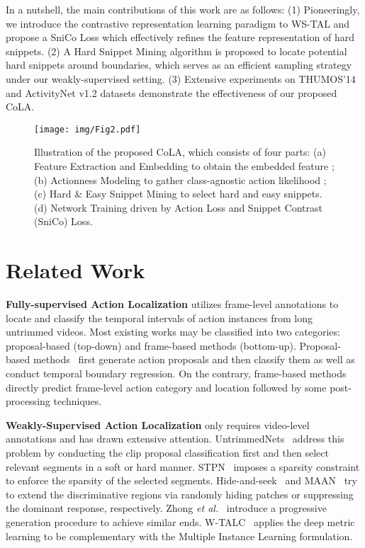 \documentclass[final]{cvpr}
\begin{document}
In a nutshell, the main contributions of this work are as follows: 
(1) Pioneeringly, we introduce the contrastive representation learning paradigm to WS-TAL and propose a SniCo Loss which effectively refines the feature representation of hard snippets. (2) A Hard Snippet Mining algorithm is proposed to locate potential hard snippets around boundaries, which serves as an efficient sampling strategy under our weakly-supervised setting. (3) Extensive experiments on THUMOS'14 and ActivityNet v1.2 datasets demonstrate the effectiveness of our proposed CoLA. \begin{figure*}[!htbp]
\begin{center}
\texttt{[image: img/Fig2.pdf]}
\end{center}
   \caption{Illustration of the proposed CoLA, which consists of four parts: (a) Feature Extraction and Embedding to obtain the embedded feature ; (b) Actionness Modeling to gather class-agnostic action likelihood ; (c) Hard \& Easy Snippet Mining to select hard and easy snippets. (d) Network Training driven by Action Loss and Snippet Contrast (SniCo) Loss.}
\label{fig:short}
\end{figure*}

\section{Related Work}

\textbf{Fully-supervised Action Localization} utilizes frame-level annotations to locate and classify the temporal intervals of action instances from long untrimmed videos. Most existing works may be classified into two categories: proposal-based (top-down) and frame-based methods (bottom-up). Proposal-based methods~\cite{shou2016temporal,zhao2017temporal,xu2017r,dai2017temporal,chao2018rethinking,shou2017cdc,lin2018bsn,lin2019bmn,zeng2019graph,lin2020fast} first generate action proposals and then classify them as well as conduct temporal boundary regression. On the contrary, frame-based methods~\cite{lin2017single, buch2019end,long2019gaussian,zhao2020bottom} directly predict frame-level action category and location followed by some post-processing techniques.

\textbf{Weakly-Supervised Action Localization} only requires video-level annotations and has drawn extensive attention. UntrimmedNets~\cite{wang2017untrimmednets} address this problem by conducting the clip proposal classification first and then select relevant segments in a soft or hard manner. STPN~\cite{nguyen2018weakly} imposes a sparsity constraint to enforce the sparsity of the selected segments. Hide-and-seek~\cite{singh2017hide} and MAAN~\cite{yuan2019marginalized} try to extend the discriminative regions via randomly hiding patches or suppressing the dominant response, respectively. Zhong \textit{et al.}~\cite{zhong2018step} introduce a progressive generation procedure to achieve similar ends. W-TALC~\cite{paul2018w} applies the deep metric learning to be complementary with the Multiple Instance Learning formulation. 
\end{document}
